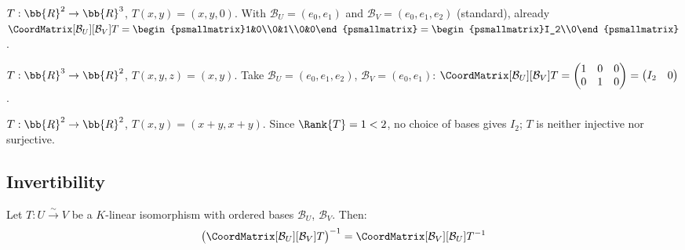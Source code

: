 \begin{example}
    $T: \bb{R}^2 \to \bb{R}^3$, $T(x,y) = (x, y, 0)$.
    With $\mathcal{B}_U = (e_0, e_1)$ and $\mathcal{B}_V = (e_0, e_1, e_2)$ (standard), already
    $\CoordMatrix[\mathcal{B}_U][\mathcal{B}_V]{T}
    = \begin{psmallmatrix}1&0\\0&1\\0&0\end{psmallmatrix}
    = \begin{psmallmatrix}I_2\\0\end{psmallmatrix}$.
\end{example}

\begin{example}
    $T: \bb{R}^3 \to \bb{R}^2$, $T(x,y,z) = (x,y)$.
    Take $\mathcal{B}_U = (e_0, e_1, e_2)$, $\mathcal{B}_V = (e_0, e_1)$:
    $\CoordMatrix[\mathcal{B}_U][\mathcal{B}_V]{T}
    = \begin{pmatrix}1&0&0\\0&1&0\end{pmatrix}
    = \begin{pmatrix}I_2 & 0\end{pmatrix}$.
\end{example}

\begin{example}
    $T: \bb{R}^2 \to \bb{R}^2$, $T(x,y) = (x+y, x+y)$. Since
    $\Rank{T} = 1 < 2$, no choice of bases gives $I_2$; $T$ is neither injective
    nor surjective.
\end{example}

\subsection{Invertibility}

\begin{theorem}
\label{thm:mat-inverse}
    Let $T: U \xrightarrow{\sim} V$ be a $K$-linear isomorphism with ordered bases
    $\mathcal{B}_U$, $\mathcal{B}_V$. Then:
    \[
        \bigl(\CoordMatrix[\mathcal{B}_U][\mathcal{B}_V]{T}\bigr)^{-1}
        = \CoordMatrix[\mathcal{B}_V][\mathcal{B}_U]{T^{-1}}
    \]
\end{theorem}

